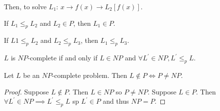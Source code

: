 \documentclass[12pt]{article}
\begin{document}
Then, to solve $L_1$: $x \to f(x) \to L_2[f(x)]$.

\begin{lemma}
If $L_1 \leq_p L_2$ and $L_2 \in P$, then $L_1 \in P$.
\end{lemma}

\begin{lemma}
If $L1 \leq_p L_2$ and $L_2 \leq_p L_3$, then $L_1 \leq_p L_3$.
\end{lemma}

\begin{definition}
$L$ is $NP$-complete if  and only if $L \in NP$ and $\forall L^\prime \in NP, L^\prime \leq_p L$.
\end{definition}

\begin{lemma}
Let $L$ be an $NP$-complete problem. Then $L \not\in P \iff P \neq NP$.
\end{lemma}

\begin{proof}
Suppose $L \not\in P$. Then $L\in NP$ so $P \neq NP$. Suppose $L \in P$. Then $\forall L^\prime \in NP \implies L^\prime \leq_p L$ sp $L^\prime \in P$ and thus $NP = P$.
\end{proof}
\end{document}
